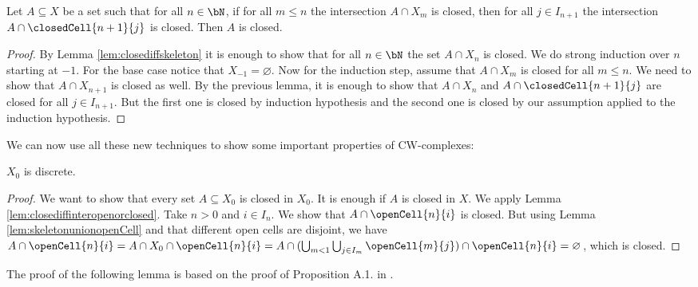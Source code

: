 \begin{lem}\label{lem:inductionlevel}
    Let $A \subseteq X$ be a set such that for all $n \in \bN$, if for all $m \le n$ the intersection $A \cap X_m$ is closed, then for all $j \in I_{n + 1}$ the intersection $A \cap \closedCell{n + 1}{j}$ is closed. 
    Then $A$ is closed. 
    \href{https://github.com/scholzhannah/CWComplexes/blob/7be4872a05b534011cc969eb5b80a4b7f0bf57e2/CWcomplexes/Lemmas.lean#L85-L96}{\faExternalLink}
\end{lem}
\begin{proof}
    By Lemma \ref{lem:closediffskeleton} it is enough to show that for all $n \in \bN$ the set $A \cap X_n$ is closed. 
    We do strong induction over $n$ starting at $-1$. 
    For the base case notice that $X_{-1} = \varnothing$.
    Now for the induction step, assume that $A \cap X_m$ is closed for all $m \le n$. 
    We need to show that $A \cap X_{n + 1}$ is closed as well. 
    By the previous lemma, it is enough to show that $A \cap X_n$ and $A \cap \closedCell{n + 1}{j}$ are closed for all $j \in I_{n + 1}$. 
    But the first one is closed by induction hypothesis and the second one is closed by our assumption applied to the induction hypothesis.
\end{proof}

We can now use all these new techniques to show some important properties of CW-complexes: 

\begin{lem} \label{lem:discretelevel0}
    $X_0$ is discrete. 
    \href{https://github.com/scholzhannah/CWComplexes/blob/7be4872a05b534011cc969eb5b80a4b7f0bf57e2/CWcomplexes/Lemmas.lean#L108-L109}{\faExternalLink}
\end{lem}
\begin{proof}
    We want to show that every set $A \subseteq X_0$ is closed in $X_0$.
    It is enough if $A$ is closed in $X$. 
    We apply Lemma \ref{lem:closediffinteropenorclosed}. 
    Take $n > 0$ and $i \in I_n$. 
    We show that $A \cap \openCell{n}{i}$ is closed. 
    But using Lemma \ref{lem:skeletonunionopenCell} and that different open cells are disjoint, we have $A \cap \openCell{n}{i} = A \cap X_0 \cap \openCell{n}{i} = A \cap (\bigcup_{m < 1}\bigcup_{j \in I_m}\openCell{m}{j}) \cap \openCell{n}{i} = \varnothing$, which is closed.
\end{proof}

The proof of the following lemma is based on the proof of Proposition A.1. in \cite{Hatcher2001}.

